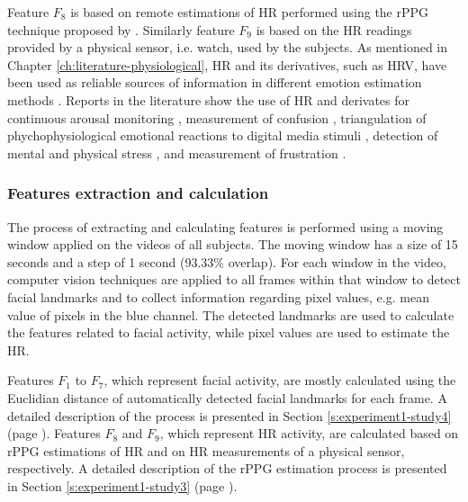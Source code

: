 Feature $F_8$ is based on remote estimations of HR performed using the rPPG technique proposed by \textcite{poh2011advancements}. Similarly feature $F_9$ is based on the HR readings provided by a physical sensor, i.e. watch, used by the subjects. As mentioned in Chapter \ref{ch:literature-physiological}, HR and its derivatives, such as HRV, have been used as reliable sources of information in different emotion estimation methods \parencite{kukolja2014comparative}. Reports in the literature show the use of HR and derivates for continuous arousal monitoring \parencite{grundlehner2009design}, measurement of confusion \parencite{xiao2015towards}, triangulation of phychophysiological emotional reactions to digital media stimuli \parencite{nogueira2015annotation}, detection of mental and physical stress \parencite{vandeput2009heart,garde2002effects}, and measurement of frustration \parencite{rodriguez2015vr}.

\subsubsection{Features extraction and calculation}

The process of extracting and calculating features is performed using a moving window applied on the videos of all subjects. The moving window has a size of 15 seconds and a step of 1 second (93.33\% overlap). For each window in the video, computer vision techniques are applied to all frames within that window to detect facial landmarks and to collect information regarding pixel values, e.g. mean value of pixels in the blue channel. The detected landmarks are used to calculate the features related to facial activity, while pixel values are used to estimate the HR.

Features $F_1$ to $F_7$, which represent facial activity, are mostly calculated using the Euclidian distance of automatically detected facial landmarks for each frame. A detailed description of the process is presented in Section \ref{s:experiment1-study4} (page \pageref{s:experiment1-study4}). Features $F_8$ and $F_9$, which represent HR activity, are calculated based on rPPG estimations of HR and on HR measurements of a physical sensor, respectively. A detailed description of the rPPG estimation process is presented in Section \ref{s:experiment1-study3} (page \pageref{s:experiment1-study3}).

